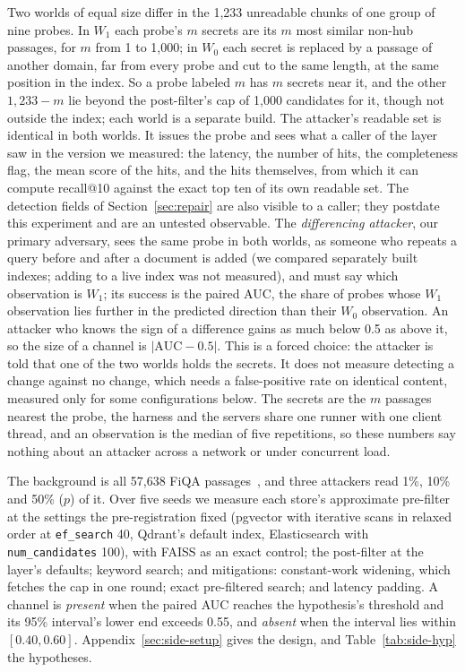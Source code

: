 Two worlds of equal size differ in the 1,233 unreadable chunks of one group of nine probes. In $W_1$ each probe's $m$ secrets are its $m$ most
similar non-hub passages, for $m$ from 1 to 1,000; in $W_0$ each secret is replaced by a passage of another domain, far from every probe and cut to
the same length, at the same position in the index. So a probe labeled $m$ has $m$ secrets near it, and the other $1{,}233 - m$ lie beyond the post-filter's cap of 1,000 candidates for it, though not outside the index; each world is a separate build. The attacker's readable set is identical in both worlds. It
issues the probe and sees what a caller of the layer saw in the version we measured: the latency, the number of hits,
the completeness flag, the mean score of the hits, and the hits themselves, from which it can compute recall@10
against the exact top ten of its own readable set. The detection fields of Section~\ref{sec:repair} are also visible
to a caller; they postdate this experiment and are an untested observable. The \emph{differencing attacker}, our
primary adversary, sees the same probe in both worlds, as someone who repeats a query before and after a document is
added (we compared separately built indexes; adding to a live index was not measured), and must say which observation is $W_1$; its success is the paired AUC, the share of probes whose $W_1$ observation lies further in the predicted
direction than their $W_0$ observation. An attacker who knows the sign of a difference gains as much below 0.5 as
above it, so the size of a channel is $|\mathrm{AUC} - 0.5|$. This is a forced choice: the attacker is told that one of the two worlds holds the secrets. It does not measure
detecting a change against no change, which needs a false-positive rate on identical content, measured only for some configurations below. The secrets
are the $m$ passages nearest the probe, the harness and the servers share one runner with one client thread, and an observation is the median of five repetitions, so these
numbers say nothing about an attacker across a network or under concurrent load.

The background is all 57,638 FiQA passages~\cite{maia2018www18}, and three attackers read 1\%, 10\% and 50\% ($p$) of it. Over five
seeds we measure each store's approximate pre-filter at the settings the pre-registration fixed (pgvector with iterative scans in relaxed order at \texttt{ef\_search} 40, Qdrant's default index, Elasticsearch with \texttt{num\_candidates} 100), with FAISS as an exact
control; the post-filter at the layer's defaults; keyword search; and mitigations: constant-work widening, which fetches the cap in
one round; exact pre-filtered search; and latency padding. A channel is \emph{present} when the paired AUC reaches the hypothesis's
threshold and its 95\% interval's lower end exceeds 0.55, and \emph{absent} when the interval lies within $[0.40, 0.60]$.
Appendix~\ref{sec:side-setup} gives the design, and Table~\ref{tab:side-hyp} the hypotheses.

